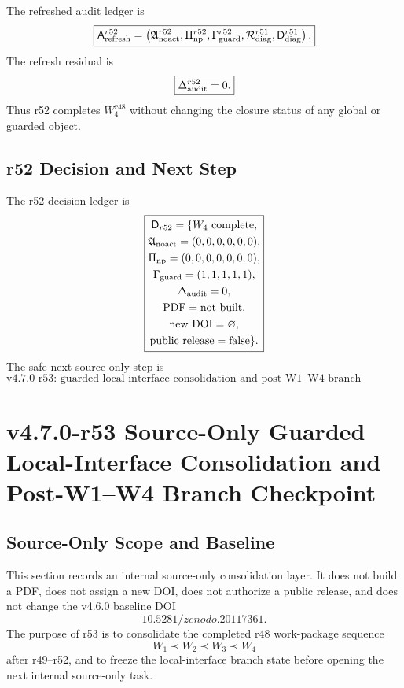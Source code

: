 The refreshed audit ledger is
\[
\boxed{
\mathsf A_{\rm refresh}^{r52}
=
\left(
\mathfrak A_{\rm noact}^{r52},
\Pi_{\rm np}^{r52},
\Gamma_{\rm guard}^{r52},
\mathcal R_{\rm diag}^{r51},
\mathsf D_{\rm diag}^{r51}
\right).
}
\]
The refresh residual is
\[
\boxed{
\Delta_{\rm audit}^{r52}=0.
}
\]
Thus r52 completes \(W_4^{r48}\) without changing the closure status of any global or guarded object.

\subsection{r52 Decision and Next Step}
\label{subsec:r52-decision-next-step}

The r52 decision ledger is
\[
\boxed{
\begin{gathered}
\mathsf D_{r52}
=
\{
W_4\text{ complete},\\
\mathfrak A_{\rm noact}=(0,0,0,0,0,0),\\
\Pi_{\rm np}=(0,0,0,0,0,0,0),\\
\Gamma_{\rm guard}=(1,1,1,1,1),\\
\Delta_{\rm audit}=0,\\
\mathrm{PDF}=\mathrm{not\ built},\\
\mathrm{new\ DOI}=\varnothing,\\
\mathrm{public\ release}=\mathrm{false}
\}.
\end{gathered}
}
\]
The safe next source-only step is
\[
\boxed{
\text{v4.7.0-r53: guarded local-interface consolidation and post-W1--W4 branch checkpoint.}
}
\]



\clearpage
\section{v4.7.0-r53 Source-Only Guarded Local-Interface Consolidation and Post-W1--W4 Branch Checkpoint}
\label{sec:r53-local-interface-consolidation-checkpoint}

\subsection{Source-Only Scope and Baseline}
\label{subsec:r53-source-only-scope-baseline}

This section records an internal source-only consolidation layer.  It does not build a PDF, does not assign a new DOI, does not authorize a public release, and does not change the v4.6.0 baseline DOI
\[
\boxed{10.5281/zenodo.20117361.}
\]
The purpose of r53 is to consolidate the completed r48 work-package sequence
\[
W_1\prec W_2\prec W_3\prec W_4
\]
after r49--r52, and to freeze the local-interface branch state before opening the next internal source-only task.

